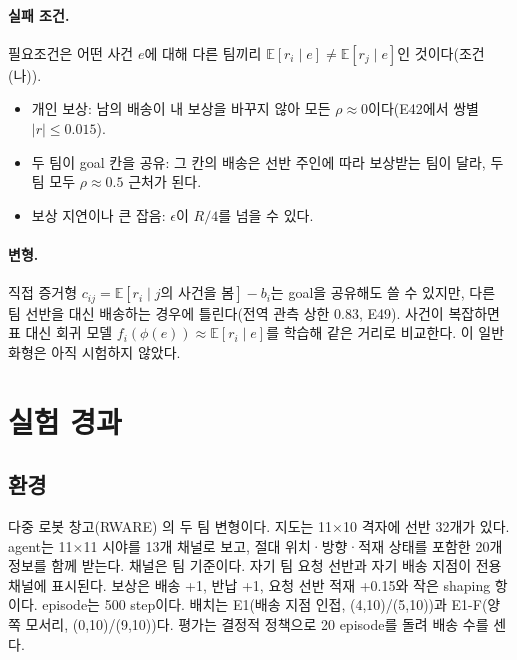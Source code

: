 \documentclass[11pt]{article}
\begin{document}
\paragraph{실패 조건.} 필요조건은 어떤 사건 $e$에 대해 다른 팀끼리 $\mathbb{E}[r_i \mid e] \ne \mathbb{E}[r_j \mid e]$인 것이다(조건 (나)).
\begin{itemize}
  \item 개인 보상: 남의 배송이 내 보상을 바꾸지 않아 모든 $\rho \approx 0$이다(E42에서 쌍별 $|r| \le 0.015$).
  \item 두 팀이 goal 칸을 공유: 그 칸의 배송은 선반 주인에 따라 보상받는 팀이 달라, 두 팀 모두 $\rho \approx 0.5$ 근처가 된다.
  \item 보상 지연이나 큰 잡음: $\epsilon$이 $R/4$를 넘을 수 있다.
\end{itemize}

\paragraph{변형.} 직접 증거형 $c_{ij} = \mathbb{E}[r_i \mid j\text{의 사건을 봄}] - b_i$는 goal을 공유해도 쓸 수 있지만, 다른 팀 선반을 대신 배송하는 경우에 틀린다(전역 관측 상한 0.83, E49). 사건이 복잡하면 표 대신 회귀 모델 $f_i(\phi(e)) \approx \mathbb{E}[r_i \mid e]$를 학습해 같은 거리로 비교한다. 이 일반화형은 아직 시험하지 않았다.

\section{실험 경과}

\subsection{환경}
다중 로봇 창고(RWARE) \cite{papoudakis2021}의 두 팀 변형이다. 지도는 11$\times$10 격자에 선반 32개가 있다.
agent는 11$\times$11 시야를 13개 채널로 보고, 절대 위치·방향·적재 상태를 포함한 20개 정보를 함께 받는다.
채널은 팀 기준이다. 자기 팀 요청 선반과 자기 배송 지점이 전용 채널에 표시된다.
보상은 배송 +1, 반납 +1, 요청 선반 적재 +0.15와 작은 shaping 항이다. episode는 500 step이다.
배치는 E1(배송 지점 인접, (4,10)/(5,10))과 E1-F(양쪽 모서리, (0,10)/(9,10))다.
평가는 결정적 정책으로 20 episode를 돌려 배송 수를 센다.
\end{document}
